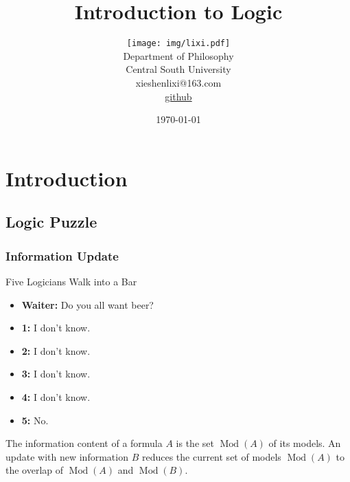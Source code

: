 \documentclass[UTF8,11pt,colorlinks,compress,openany]{beamer}%
\begin{document}
\title{Introduction to Logic}
\author{
	{\texttt{[image: img/lixi.pdf]}}\\
	\small Department of Philosophy\\
	\footnotesize Central South University\\
	\scriptsize xieshenlixi@163.com\\
	\scriptsize \href{https://github.com/rickylixi/logic}{github}
}
\date{\today}
\maketitle





\section{Introduction}

\subsection{Logic Puzzle}

\begin{frame}\frametitle{Information Update}
\begin{block}{Five Logicians Walk into a Bar}
	\begin{itemize}
		\item \textbf{Waiter:} Do you all want beer?
		\item \textbf{1:} I don't know.
		\item \textbf{2:} I don't know.
		\item \textbf{3:} I don't know.
		\item \textbf{4:} I don't know.
		\item \textbf{5:} No.
	\end{itemize}	
\end{block}
The information content of a formula $A$ is the set $\operatorname{Mod}(A)$ of its models. An update with new information $B$ reduces the current set of models $\operatorname{Mod}(A)$ to the overlap of $\operatorname{Mod}(A)$ and $\operatorname{Mod}(B)$.
\end{frame}
\end{document}
